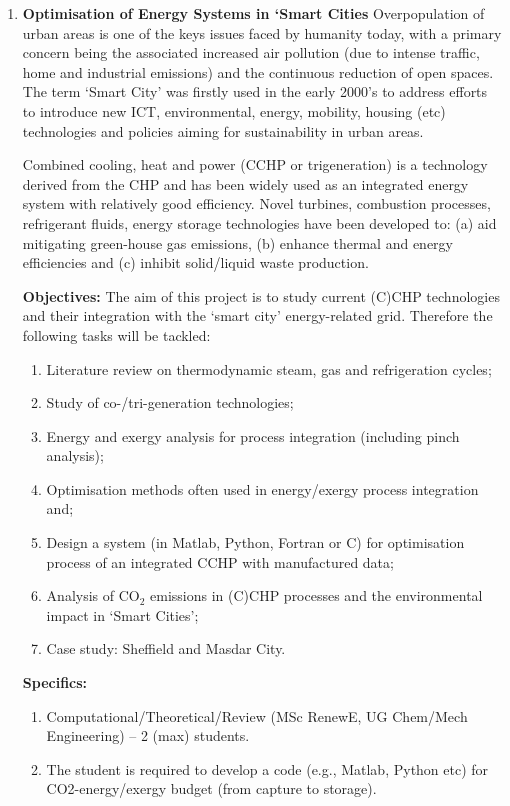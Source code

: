 \documentclass[12pts,a4paper,amsmath,amssymb,floatfix]{article}%
\newcommand{\Renew}{MSc RenewE, UG Chem/Mech Engineering}
\begin{document}
\begin{enumerate}[label=\bfseries Project: \arabic*:]
\clearpage


\item {\bf Optimisation of Energy Systems in `Smart Cities}
Overpopulation of urban areas is one of the keys issues faced by humanity today, with a primary concern being the associated increased air pollution (due to intense traffic, home and industrial emissions) and the continuous reduction of open spaces. The term `Smart City’ was firstly used  in the early 2000’s to address efforts to introduce new ICT, environmental, energy, mobility, housing (etc) technologies and policies aiming for sustainability in urban areas.

Combined cooling, heat and power (CCHP or trigeneration) is a technology derived from the CHP and has been widely used as an integrated energy system with relatively good efficiency. Novel turbines, combustion processes, refrigerant fluids, energy storage technologies have been developed to: (a) aid mitigating green-house gas emissions, (b) enhance thermal and energy efficiencies and (c) inhibit solid/liquid waste production.

\noindent
{\bf Objectives:} The aim of this project is to study current (C)CHP technologies and their integration with the `smart city’ energy-related grid. Therefore the following tasks will be tackled:
\begin{enumerate}
\item Literature review on thermodynamic steam, gas and refrigeration cycles;
\item Study of co-/tri-generation technologies;
\item Energy and exergy analysis for process integration (including pinch analysis);
\item Optimisation methods often used in energy/exergy process integration and;
\item Design a system (in Matlab, Python, Fortran or C) for optimisation process of an integrated CCHP with manufactured data;
\item Analysis of CO$_{2}$ emissions in (C)CHP processes and the environmental impact in `Smart Cities';
\item Case study: Sheffield and Masdar City.
\end{enumerate}


\noindent
{\bf Specifics:} 
\begin{enumerate}
\item Computational/Theoretical/Review (\Renew) -- 2 (max) students. 
\item The student is required to develop a code (e.g., Matlab, Python etc) for CO2-energy/exergy budget (from capture to storage).
\end{enumerate} 


\end{enumerate}
\end{document}
